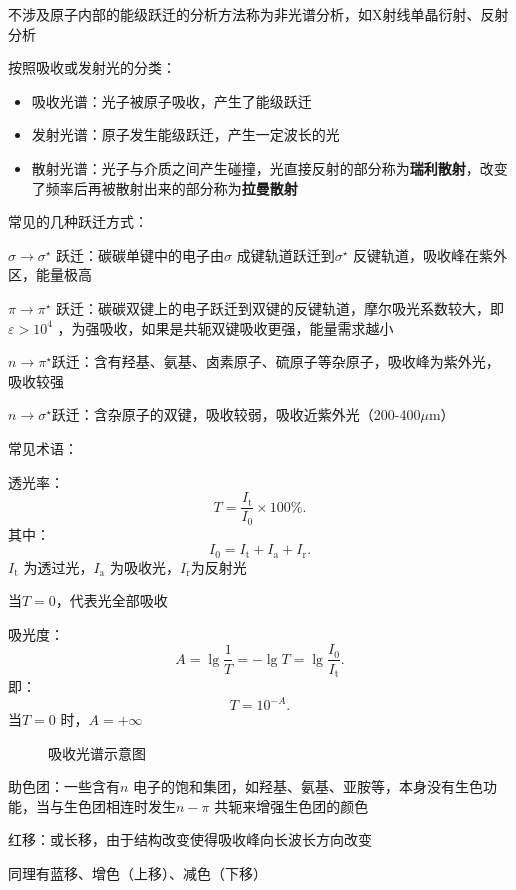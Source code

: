 \begin{notation}
    不涉及原子内部的能级跃迁的分析方法称为非光谱分析，如X射线单晶衍射、反射分析
\end{notation}
按照吸收或发射光的分类：
\begin{itemize}
    \item 吸收光谱：光子被原子吸收，产生了能级跃迁
    \item 发射光谱：原子发生能级跃迁，产生一定波长的光
    \item 散射光谱：光子与介质之间产生碰撞，光直接反射的部分称为\textbf{瑞利散射}，改变了频率后再被散射出来的部分称为\textbf{拉曼散射}
\end{itemize}
常见的几种跃迁方式：
\begin{notation}
    $\sigma\to \sigma^\star $ 跃迁：碳碳单键中的电子由$\sigma$ 成键轨道跃迁到$\sigma^\star $ 反键轨道，吸收峰在紫外区，能量极高
\end{notation}
\begin{notation}
    $\pi \to \pi ^\star $ 跃迁：碳碳双键上的电子跃迁到双键的反键轨道，摩尔吸光系数较大，即$\varepsilon>10^{4}$ ，为强吸收，如果是共轭双键吸收更强，能量需求越小
\end{notation}
\begin{notation}
    $n\to \pi ^\star $跃迁：含有羟基、氨基、卤素原子、硫原子等杂原子，吸收峰为紫外光，吸收较强
\end{notation}
\begin{notation}
    $n\to \sigma^\star $跃迁：含杂原子的双键，吸收较弱，吸收近紫外光（200-400$\mu$m）
\end{notation}
常见术语：
\begin{defi}
    透光率：\[
        T = \frac{I_\text{t}}{I_0}\times 100\%
    .\]
    其中：\[
        I_0 = I_\text{t} + I_\text{a} + I_\text{r}
    .\]
    $I_\text{t}$ 为透过光，$I_\text{a}$ 为吸收光，$I_\text{r}$为反射光
\end{defi}
当$T=0$，代表光全部吸收
\begin{defi}
    吸光度：\[
        A = \lg \frac{1}{T} = -\lg T = \lg \frac{I_0}{I_\text{t}}
    .\]
    即：\[
        T = 10^{-A}
    .\]
    当$T = 0$ 时，$A = +\infty $
\end{defi}
\begin{figure}[ht!]
    \centering
    \caption{吸收光谱示意图}
    \label{fig:吸收光谱示意图}
\end{figure}
\begin{notation}
    助色团：一些含有$n$ 电子的饱和集团，如羟基、氨基、亚胺等，本身没有生色功能，当与生色团相连时发生$n-\pi $ 共轭来增强生色团的颜色
\end{notation}
\begin{defi}
    红移：或长移，由于结构改变使得吸收峰向长波长方向改变
\end{defi}
同理有蓝移、增色（上移）、减色（下移）

